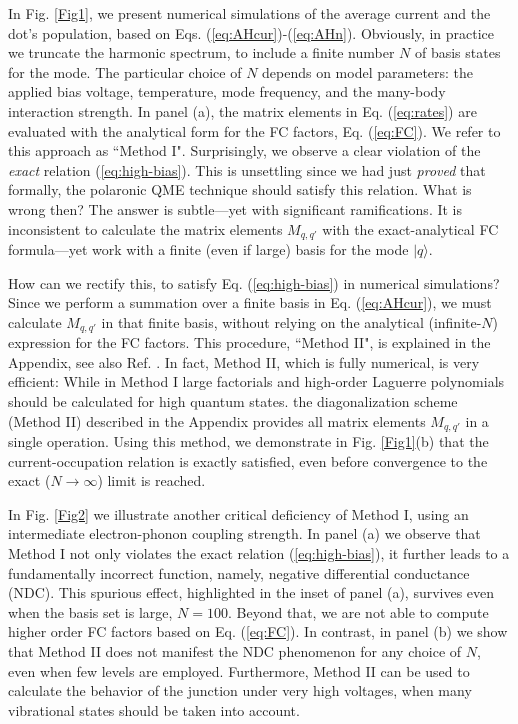 \documentclass[aps,pra,twocolumn,groupedaddress,showpacs,superscriptaddress,amssymb,amsmath]{revtex4-1}
\begin{document}
In Fig. \ref{Fig1}, we present numerical simulations of the average current and the dot's population, 
based on Eqs. (\ref{eq:AHcur})-(\ref{eq:AHn}).
Obviously, in practice we truncate the harmonic spectrum, to include
a finite number $N$ of basis states for the mode. The particular choice of $N$
depends on model parameters: the applied
bias voltage, temperature, mode frequency, and the many-body interaction strength. 
%
In panel (a), the matrix elements in Eq. (\ref{eq:rates}) are evaluated 
with the analytical form for the FC factors, Eq. (\ref{eq:FC}). We refer to this approach as ``Method I".
Surprisingly, we observe a clear violation of the {\it exact} relation (\ref{eq:high-bias}).
This is unsettling since we had just {\it proved}
that formally, the polaronic QME technique should satisfy this relation. What is wrong then?
The answer is subtle---yet with significant ramifications. 
It is inconsistent to calculate the matrix elements $M_{q,q'}$ with the exact-analytical FC formula---yet work with 
a finite (even if large) basis for the mode $|q\rangle$. 

How can we rectify this, to satisfy Eq. (\ref{eq:high-bias}) in numerical simulations? 
Since we perform a summation over a finite basis in Eq. (\ref{eq:AHcur}),
we must calculate $M_{q,q'}$ in that finite basis,
without relying on the analytical (infinite-$N$) expression for the FC factors. This procedure,  ``Method II",
is explained in the Appendix, see also Ref. \cite{Simine}.
In fact, Method II, which is fully numerical, is very efficient:
While in Method I 
large factorials and high-order Laguerre polynomials should be calculated for high quantum states.
the diagonalization scheme (Method II) described in the Appendix provides all matrix elements $M_{q,q'}$
in a single operation. 
%
Using this method, we demonstrate in Fig. \ref{Fig1}(b) that the  current-occupation relation is exactly satisfied,
even before convergence to the exact ($N\rightarrow \infty$) limit is reached.

In Fig. \ref{Fig2} we illustrate another critical deficiency of Method I,
using an intermediate electron-phonon coupling strength. 
In panel (a) we observe that Method I not only violates  the exact 
relation (\ref{eq:high-bias}), it further leads to a fundamentally incorrect function, namely, 
negative differential conductance (NDC). This spurious effect, highlighted in the inset of panel (a),
survives even when the basis set is large, $N=100$. %
%
Beyond that, we are not able to compute higher order FC factors based on Eq. (\ref{eq:FC}).
In contrast, in panel (b) we show that Method II 
does not manifest the NDC phenomenon for any choice of $N$, even when few levels are employed.
Furthermore, Method II can be used to calculate the behavior of the junction
under very high voltages, when many vibrational states should be taken into account.
\end{document}

